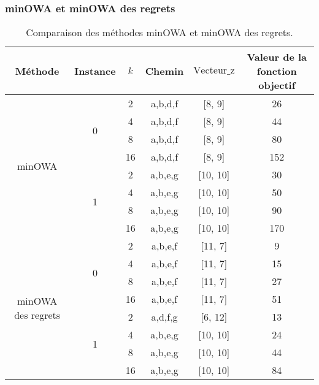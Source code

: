 \documentclass[10pt,a4paper]{report}
\begin{document}
\subsubsection{minOWA et minOWA des regrets}
\begin{table}[h!]
\centering
\renewcommand{\arraystretch}{1.5}
\begin{tabular}{|c|c|c|c|c|c|}
\hline
\textbf{Méthode}        & \textbf{Instance} & \textbf{\(k\)} & \textbf{Chemin} & \textbf{\( \text{Vecteur\_z} \)} & \textbf{Valeur de la fonction objectif} \\ \hline
\multirow{8}{*}{minOWA} & \multirow{4}{*}{0} 
                        & 2  & a,b,d,f          & [8, 9]        & 26 \\ \cline{3-6} 
                        &                       & 4  & a,b,d,f          & [8, 9]        & 44 \\ \cline{3-6} 
                        &                       & 8  & a,b,d,f          & [8, 9]        & 80 \\ \cline{3-6} 
                        &                       & 16 & a,b,d,f          & [8, 9]        & 152 \\ \cline{2-6} 
                        & \multirow{4}{*}{1} 
                        & 2  & a,b,e,g          & [10, 10]      & 30 \\ \cline{3-6} 
                        &                       & 4  & a,b,e,g          & [10, 10]      & 50 \\ \cline{3-6} 
                        &                       & 8  & a,b,e,g          & [10, 10]      & 90 \\ \cline{3-6} 
                        &                       & 16 & a,b,e,g          & [10, 10]      & 170 \\ \hline
\multirow{8}{*}{minOWA des regrets} 
                        & \multirow{4}{*}{0} 
                        & 2  & a,b,e,f          & [11, 7]       & 9 \\ \cline{3-6} 
                        &                       & 4  & a,b,e,f          & [11, 7]       & 15 \\ \cline{3-6} 
                        &                       & 8  & a,b,e,f          & [11, 7]       & 27 \\ \cline{3-6} 
                        &                       & 16 & a,b,e,f          & [11, 7]       & 51 \\ \cline{2-6} 
                        & \multirow{4}{*}{1} 
                        & 2  & a,d,f,g          & [6, 12]       & 13 \\ \cline{3-6} 
                        &                       & 4  & a,b,e,g          & [10, 10]      & 24 \\ \cline{3-6} 
                        &                       & 8  & a,b,e,g          & [10, 10]      & 44 \\ \cline{3-6} 
                        &                       & 16 & a,b,e,g          & [10, 10]      & 84 \\ \hline
\end{tabular}
\caption{Comparaison des méthodes minOWA et minOWA des regrets.}
\label{tab:methods}
\end{table}
\end{document}
